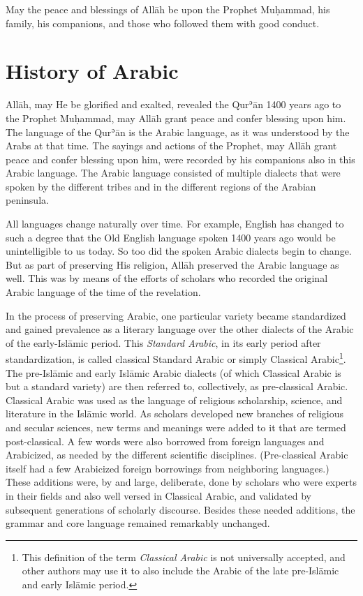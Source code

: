 \documentclass[
  10pt,
]{book}
\begin{document}
May the peace and blessings of Allāh be upon the Prophet Muḥammad, his family, his companions, and those who followed them with good conduct.

\section{History of Arabic}\label{history-of-arabic}

Allāh, may He be glorified and exalted, revealed the Qurʾān 1400 years ago to the Prophet Muḥammad, may Allāh grant peace and confer blessing upon him. The language of the Qurʾān is the Arabic language, as it was understood by the Arabs at that time. The sayings and actions of the Prophet, may Allāh grant peace and confer blessing upon him, were recorded by his companions also in this Arabic language. The Arabic language consisted of multiple dialects that were spoken by the different tribes and in the different regions of the Arabian peninsula.

All languages change naturally over time. For example, English has changed to such a degree that the Old English language spoken 1400 years ago would be unintelligible to us today. So too did the spoken Arabic dialects begin to change. But as part of preserving His religion, Allāh preserved the Arabic language as well. This was by means of the efforts of scholars who recorded the original Arabic language of the time of the revelation.

In the process of preserving Arabic, one particular variety became standardized and gained prevalence as a literary language over the other dialects of the Arabic of the early-Islāmic period. This \emph{Standard Arabic}, in its early period after standardization, is called classical Standard Arabic or simply Classical Arabic\footnote{This definition of the term \emph{Classical Arabic} is not universally accepted, and other authors may use it to also include the Arabic of the late pre-Islāmic and early Islāmic period.}. The pre-Islāmic and early Islāmic Arabic dialects (of which Classical Arabic is but a standard variety) are then referred to, collectively, as pre-classical Arabic. Classical Arabic was used as the language of religious scholarship, science, and literature in the Islāmic world. As scholars developed new branches of religious and secular sciences, new terms and meanings were added to it that are termed post-classical. A few words were also borrowed from foreign languages and Arabicized, as needed by the different scientific disciplines. (Pre-classical Arabic itself had a few Arabicized foreign borrowings from neighboring languages.) These additions were, by and large, deliberate, done by scholars who were experts in their fields and also well versed in Classical Arabic, and validated by subsequent generations of scholarly discourse. Besides these needed additions, the grammar and core language remained remarkably unchanged.
\end{document}
